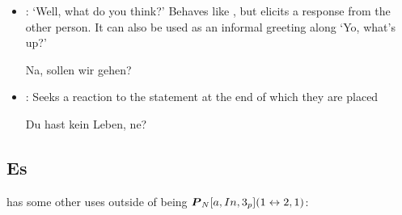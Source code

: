 \begin{itemize}
    \item {}: `Well, what do you think?' Behaves like , but  elicits a response from the other person. It  can also be used as an informal greeting along  `Yo, what's up?' \begin{example} Na, sollen wir gehen? \end{example}
    \item {}: Seeks a reaction to the statement at the end of which they are placed \begin{example}Du hast kein Leben, ne? \end{example}
\end{itemize}
\subsection[It]{Es}
 has some other uses outside of being $\boldsymbol{P}_N[a,In,3_p](1\leftrightarrow2,1)$:
